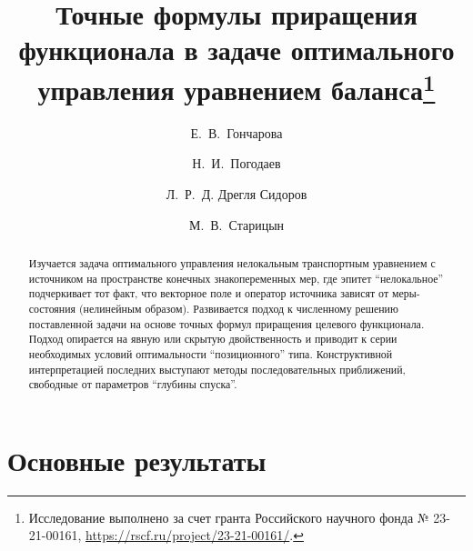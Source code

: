 \usepackage[russian]{nla}


\fi

\title{Точные формулы приращения функционала в задаче оптимального управления уравнением баланса\thanks{Исследование выполнено за счет гранта Российского научного фонда № 23-21-00161, \url{https://rscf.ru/project/23-21-00161/}.}}
\author{Е.~В.~Гончарова \and Н.~И.~Погодаев \and Л.~Р.~Д. Дрегля Сидоров \and М.~В.~Старицын
}


\maketitle

\begin{abstract}

Изучается задача оптимального управления нелокальным транспортным уравнением с источником на пространстве конечных знакопеременных мер, где эпитет ``нелокальное'' подчеркивает тот факт, что векторное поле и оператор источника зависят от меры-состояния (нелинейным образом). Развивается подход к численному решению поставленной задачи на основе точных формул приращения целевого функционала. Подход опирается на явную или скрытую двойственность и приводит к серии необходимых условий оптимальности ``позиционного'' типа. Конструктивной интерпретацией последних выступают методы последовательных приближений, свободные от параметров ``глубины спуска''. 

\end{abstract}

\section{Основные результаты} %

